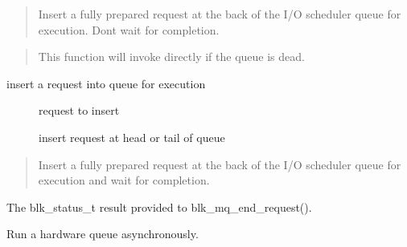 \documentclass[a4paper,11pt,english]{sphinxmanual}
\begin{document}
\begin{quote}

Insert a fully prepared request at the back of the I/O scheduler queue
for execution.  Don\textquotesingle{}t wait for completion.
\end{quote}

\begin{quote}

This function will invoke  directly if the queue is dead.
\end{quote}

\begin{fulllineitems}
\label{\detokenize{blk-mq:c.blk_execute_rq}}
insert a request into queue for execution

\end{fulllineitems}


\begin{description}
\item[{}] \leavevmode
request to insert

\item[{}] \leavevmode
insert request at head or tail of queue

\end{description}

\begin{quote}

Insert a fully prepared request at the back of the I/O scheduler queue
for execution and wait for completion.
\end{quote}


The blk\_status\_t result provided to blk\_mq\_end\_request().

\begin{fulllineitems}
\label{\detokenize{blk-mq:c.blk_mq_delay_run_hw_queue}}
Run a hardware queue asynchronously.

\end{fulllineitems}
\end{document}
